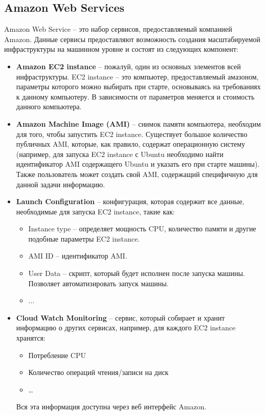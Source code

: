 \subsection{Amazon Web Services}
	Amazon Web Service -- это набор сервисов, предоставляемый компанией Amazon. Данные сервисы предоставляют возможность создания масштабируемой инфраструктуры на машинном уровне и состоят из следующих компонент:
\begin{itemize}
	\item \textbf{Amazon EC2 instance} -- пожалуй, один из основных элементов всей инфраструктуры. EC2 instance -- это компьютер, предоставляемый амазоном, параметры которого можно выбирать при старте, основываясь на требованиях к данному компьютеру. В зависимости от параметров меняется и стоимость данного компьютера.
	\item \textbf{Amazon Machine Image (AMI)} -- снимок памяти компьютера, необходим для того, чтобы запустить EC2 instance. Существует большое количество публичных AMI, которые, как правило, содержат операционную систему (например, для запуска EC2 instance с Ubuntu необходимо найти идентификатор AMI содержащего Ubuntu  и указать его при старте машины). Также пользователь может создать свой AMI, содержащий специфичную для данной задачи информацию.
	\item \textbf{Launch Configuration} -- конфигурация, которая содержит все данные, необходимые для запуска EC2 instance, такие как: 
	\begin{itemize}
		\item Instance type -- определяет мощность CPU, количество памяти и другие подобные параметры  EC2 instance.
		\item AMI ID -- идентификатор AMI.
		\item User Data -- скрипт, который будет исполнен после запуска машины. Позволяет автоматизировать запуск машины.
		\item ...
	\end{itemize}
	\item \textbf{Cloud Watch Monitoring} -- сервис, который собирает и хранит информацию о других сервисах, например, для каждого EC2 instance хранятся: 
	\begin{itemize}
		\item Потребление CPU
		\item Количество операций чтения/записи на диск
		\item \dots
	\end{itemize}
	Вся эта информация доступна через веб интерфейс Amazon. %

\end{itemize}
